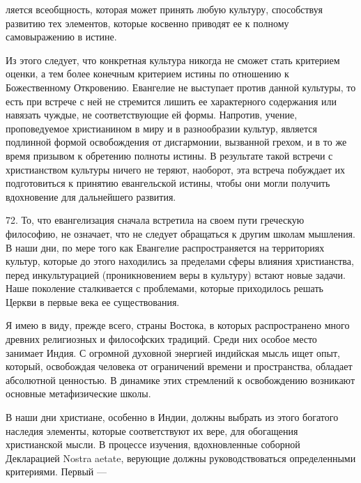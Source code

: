 \documentclass[a5paper,10pt]{article}
\begin{document}
ляется всеобщность, которая может принять любую культуру, способствуя развитию
тех элементов, которые косвенно приводят ее к полному самовыражению в истине.

Из этого следует, что конкретная культура никогда не сможет стать критерием
оценки, а тем более конечным критерием истины по отношению к Божественному
Откровению. Евангелие не выступает против данной культуры, то есть при встрече
с ней не стремится лишить ее характерного содержания или навязать чуждые, не
соответствующие ей формы. Напротив, учение, проповедуемое христианином в миру и
в разнообразии культур, является подлинной формой освобождения от дисгармонии,
вызванной грехом, и в то же время призывом к обретению полноты истины. В
результате такой встречи с христианством культуры ничего не теряют, наоборот,
эта встреча побуждает их подготовиться к принятию евангельской истины, чтобы
они могли получить вдохновение для дальнейшего развития.

72. То, что евангелизация сначала встретила на своем пути греческую философию,
не означает, что не следует обращаться к другим школам мышления. В наши дни, по
мере того как Евангелие распространяется на территориях культур, которые до
этого находились за пределами сферы влияния христианства, перед инкультурацией
(проникновением веры в культуру) встают новые задачи. Наше поколение
сталкивается с проблемами, которые приходилось решать Церкви в первые века ее
существования.

Я имею в виду, прежде всего, страны Востока, в которых распространено много
древних религиозных и философских традиций. Среди них особое место занимает
Индия. С огромной духовной энергией индийская мысль ищет опыт, который,
освобождая человека от ограничений времени и пространства, обладает абсолютной
ценностью. В динамике этих стремлений к освобождению возникают основные
метафизические школы.

В наши дни христиане, особенно в Индии, должны выбрать из этого богатого
наследия элементы, которые соответствуют их вере, для обогащения христианской
мысли. В процессе изучения, вдохновленные соборной Декларацией Nostra aetate,
верующие должны руководствоваться определенными критериями. Первый —
\end{document}
